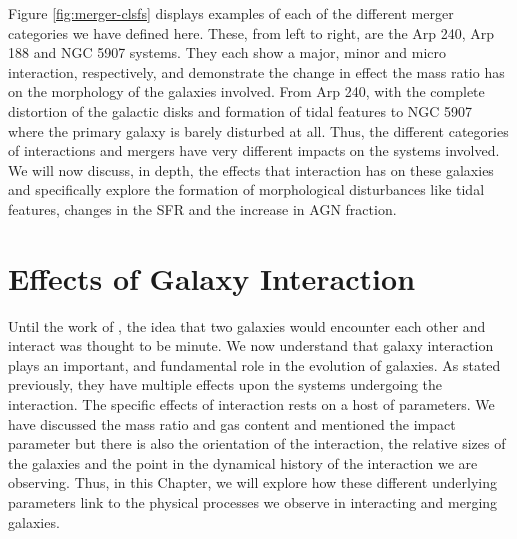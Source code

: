 Figure \ref{fig:merger-clsfs} displays examples of each of the different merger categories we have defined here. These, from left to right, are the Arp 240, Arp 188 and NGC 5907 systems. They each show a major, minor and micro interaction, respectively, and demonstrate the change in effect the mass ratio has on the morphology of the galaxies involved. From Arp 240, with the complete distortion of the galactic disks and formation of tidal features to NGC 5907 where the primary galaxy is barely disturbed at all. Thus, the different categories of interactions and mergers have very different impacts on the systems involved. We will now discuss, in depth, the effects that interaction has on these galaxies and specifically explore the formation of morphological disturbances like tidal features, changes in the SFR and the increase in AGN fraction.

\section{Effects of Galaxy Interaction}\label{sec:int_effects}
Until the work of \citet{1972ApJ...178..623T}, the idea that two galaxies would encounter each other and interact was thought to be minute. We now understand that galaxy interaction plays an important, and fundamental role in the evolution of galaxies. As stated previously, they have multiple effects upon the systems undergoing the interaction. The specific effects of interaction rests on a host of parameters. We have discussed the mass ratio and gas content and mentioned the impact parameter but there is also the orientation of the interaction, the relative sizes of the galaxies and the point in the dynamical history of the interaction we are observing. Thus, in this Chapter, we will explore how these different underlying parameters link to the physical processes we observe in interacting and merging galaxies.

